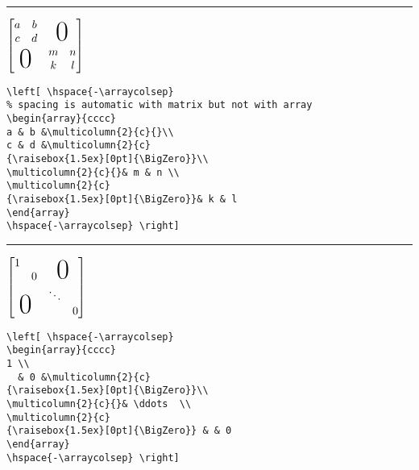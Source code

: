 %
\begin{center}{\rule{10cm}{0.5pt}}\end{center}
%
$\left[ \hspace{-\arraycolsep}
\begin{array}{cccc}
a & b &\multicolumn{2}{c}{}\\
c & d &\multicolumn{2}{c}
{\raisebox{1.5ex}[0pt]{\BigZero}}\\
\multicolumn{2}{c}{}& m & n \\
\multicolumn{2}{c}
{\raisebox{1.5ex}[0pt]{\BigZero}}& k & l
\end{array}
\hspace{-\arraycolsep} \right] $
%
%
\begin{verbatim}
\left[ \hspace{-\arraycolsep}
% spacing is automatic with matrix but not with array
\begin{array}{cccc}
a & b &\multicolumn{2}{c}{}\\
c & d &\multicolumn{2}{c}
{\raisebox{1.5ex}[0pt]{\BigZero}}\\
\multicolumn{2}{c}{}& m & n \\
\multicolumn{2}{c}
{\raisebox{1.5ex}[0pt]{\BigZero}}& k & l
\end{array}
\hspace{-\arraycolsep} \right]
\end{verbatim}
%
%
\begin{center}{\rule{10cm}{0.5pt}}\end{center}
%
$\left[ \hspace{-\arraycolsep}
\begin{array}{cccc}
1 \\
  & 0 &\multicolumn{2}{c}
{\raisebox{1.5ex}[0pt]{\BigZero}}\\
\multicolumn{2}{c}{}& \ddots  \\
\multicolumn{2}{c}
{\raisebox{1.5ex}[0pt]{\BigZero}} & & 0
\end{array}
\hspace{-\arraycolsep} \right]$
%
%
\begin{verbatim}
\left[ \hspace{-\arraycolsep}
\begin{array}{cccc}
1 \\
  & 0 &\multicolumn{2}{c}
{\raisebox{1.5ex}[0pt]{\BigZero}}\\
\multicolumn{2}{c}{}& \ddots  \\
\multicolumn{2}{c}
{\raisebox{1.5ex}[0pt]{\BigZero}} & & 0
\end{array}
\hspace{-\arraycolsep} \right]
\end{verbatim}
